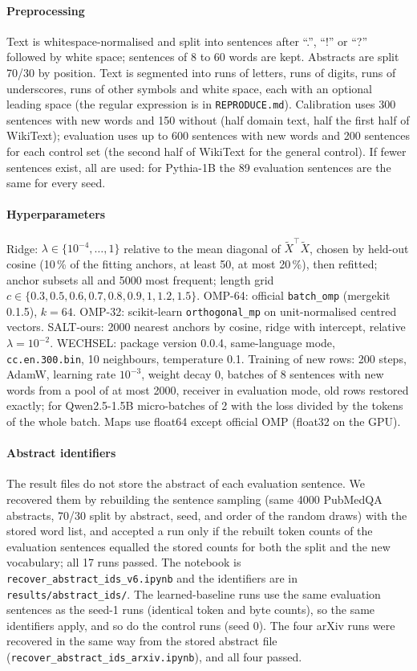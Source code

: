 \documentclass[preprint,12pt]{elsarticle}
\begin{document}
\paragraph{Preprocessing} Text is whitespace-normalised and split into sentences after ``.'', ``!'' or ``?'' followed by white space; sentences of 8 to 60 words are kept. Abstracts are split 70/30 by position. Text is segmented into runs of letters, runs of digits, runs of underscores, runs of other symbols and white space, each with an optional leading space (the regular expression is in \texttt{REPRODUCE.md}). Calibration uses 300 sentences with new words and 150 without (half domain text, half the first half of WikiText); evaluation uses up to 600 sentences with new words and 200 sentences for each control set (the second half of WikiText for the general control). If fewer sentences exist, all are used: for Pythia-1B the 89 evaluation sentences are the same for every seed.

\paragraph{Hyperparameters} Ridge: $\lambda\in\{10^{-4},\dots,1\}$ relative to the mean diagonal of $\tilde X^\top\tilde X$, chosen by held-out cosine (10\,\% of the fitting anchors, at least 50, at most 20\,\%), then refitted; anchor subsets all and 5000 most frequent; length grid $c\in\{0.3,0.5,0.6,0.7,0.8,0.9,1,1.2,1.5\}$. OMP-64: official \texttt{batch\_omp} (mergekit 0.1.5), $k=64$. OMP-32: scikit-learn \texttt{orthogonal\_mp} on unit-normalised centred vectors. SALT-ours: 2000 nearest anchors by cosine, ridge with intercept, relative $\lambda=10^{-2}$. WECHSEL: package version 0.0.4, same-language mode, \texttt{cc.en.300.bin}, 10 neighbours, temperature 0.1. Training of new rows: 200 steps, AdamW, learning rate $10^{-3}$, weight decay 0, batches of 8 sentences with new words from a pool of at most 2000, receiver in evaluation mode, old rows restored exactly; for Qwen2.5-1.5B micro-batches of 2 with the loss divided by the tokens of the whole batch. Maps use float64 except official OMP (float32 on the GPU).

\paragraph{Abstract identifiers} The result files do not store the abstract of each evaluation sentence. We recovered them by rebuilding the sentence sampling (same 4000 PubMedQA abstracts, 70/30 split by abstract, seed, and order of the random draws) with the stored word list, and accepted a run only if the rebuilt token counts of the evaluation sentences equalled the stored counts for both the split and the new vocabulary; all 17 runs passed. The notebook is \texttt{recover\_abstract\_ids\_v6.ipynb} and the identifiers are in \texttt{results/abstract\_ids/}. The learned-baseline runs use the same evaluation sentences as the seed-1 runs (identical token and byte counts), so the same identifiers apply, and so do the control runs (seed 0). The four arXiv runs were recovered in the same way from the stored abstract file (\texttt{recover\_abstract\_ids\_arxiv.ipynb}), and all four passed.
\end{document}
